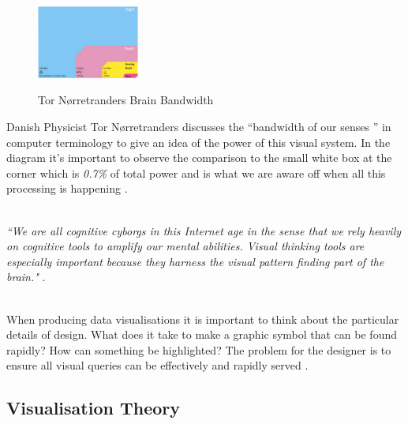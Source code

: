 \documentclass[a4paper,11pt,titlepage]{article}
\begin{document}
		\begin{figure}[H]
    			\centering	
			{{\includegraphics[width=0.3\textwidth]
    				{img/brain_bandwidth.png} 
    			}}%
    			\caption{Tor Nørretranders Brain Bandwidth}%
    		\label{fig:TufteExcellence}
		\end{figure}
		
		\par 
		Danish Physicist Tor Nørretranders discusses the ``bandwidth of our senses ” in computer terminology to give an idea of the power of this visual system. In the diagram it's important to observe the comparison to the small white box at the corner which is \textit{0.7\%} of total power and is what we are aware off when all this processing is happening \cite{Tufte2012}.		
		\\\
		\par 
		\textit{``We are all cognitive cyborgs in this Internet age in the sense that we rely heavily on cognitive tools to amplify our mental abilities. Visual thinking tools are especially important because they harness the visual pattern finding part of the brain."} \cite{Ware2010}.
		\\\
		\par 
		When producing data visualisations it is important to think about the particular details of design. What does it take to make a graphic symbol that can be found rapidly? How can something be highlighted? The problem for the designer is to ensure all visual queries can be effectively and rapidly served \cite{Keim2002}. 

	\subsection{Visualisation Theory}
\end{document}

